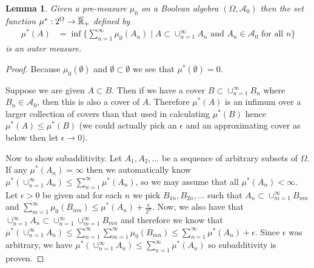\documentclass{amsart}
\newtheorem{lem}[thm]{Lemma}
\theoremstyle{remark}
\theoremstyle{definition}
\begin{document}
\begin{lem}\label{PremeasureToOuterMeasure}Given a pre-measure $\mu_0$ on a Boolean algebra $(\Omega,
  \mathcal{A}_0)$ then the set function $\mu^* : 2^\Omega \to
  \overline{\mathbb{R}}_+$ defined by
\begin{align*}
\mu^*(A) &= \inf \lbrace \sum_{n=1}^\infty \mu_0(A_n) \mid A \subset
\cup_{n=1}^\infty A_n \text { and } A_n \in \mathcal{A}_0 \text{ for
  all $n$} \rbrace
\end{align*}
is an outer measure.
\end{lem}
\begin{proof}
Because $\mu_0(\emptyset)$ and $\emptyset \subset \emptyset$ we see
that $\mu^*(\emptyset) = 0$.

Suppose we are given $A \subset B$.  Then if we have a cover $B
\subset \cup_{n=1}^\infty B_n$ where $B_n \in \mathcal{A}_0$, then
this is also a cover of $A$.  Therefore $\mu^*(A)$ is an infimum over
a larger collection of covers than that used in calculating $\mu^*(B)$
hence $\mu^*(A) \leq \mu^*(B)$ (we could actually pick an $\epsilon$
and an approximating cover as below then let $\epsilon \to 0$).

Now to show subadditivity.  Let $A_1, A_2, \dotsc$ be a sequence of
arbitrary subsets of $\Omega$.  If any $\mu^*(A_n) = \infty$ then we
automatically know $\mu^*(\cup_{n=1}^\infty A_n) \leq \sum_{n=1}^\infty \mu^*(A_n)$, so we
may assume that all $\mu^*(A_n) < \infty$.  Let $\epsilon > 0$ be
given and for each $n$ we pick $B_{1n}, B_{2n}, \dotsc$ such that $A_n
\subset \cup_{m=1}^\infty B_{mn}$ and $\sum_{m=1}^\infty \mu_0(B_{mn})
\leq \mu^*(A_n) + \frac{\epsilon}{2^n}$.  Now, we also have that
$\cup_{n=1}^\infty A_n
\subset  \cup_{n=1}^\infty \cup_{m=1}^\infty B_{mn}$ and therefore we
know that $\mu^*(\cup_{n=1}^\infty A_n) \leq \sum_{n=1}^\infty \sum_{m=1}^\infty
\mu_0(B_{mn}) \leq \sum_{n=1}^\infty \mu^*(A_n) + \epsilon$.  Since
$\epsilon$ was arbitrary, we have $\mu^*(\cup_{n=1}^\infty A_n) \leq \sum_{n=1}^\infty
\mu^*(A_n)$ so subadditivity is proven.
\end{proof}
\end{document}
